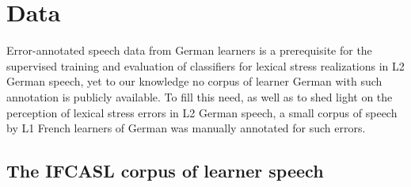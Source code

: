 \documentclass[a4paper]{article}
\begin{document}
	
	\section{Data}
	\label{sec:data}
	
	Error-annotated speech data from German learners is a prerequisite for the supervised training and evaluation of classifiers for  lexical stress realizations in L2 German speech, yet to our knowledge no corpus of learner German with such annotation is publicly available. To fill this need, as well as to shed light on the perception of lexical stress errors in L2 German speech, a small corpus of speech by L1 French learners of German was manually annotated for such errors.
	
		\subsection{The IFCASL corpus of learner speech}
		\label{sec:data:corpus}		
		
\end{document}
